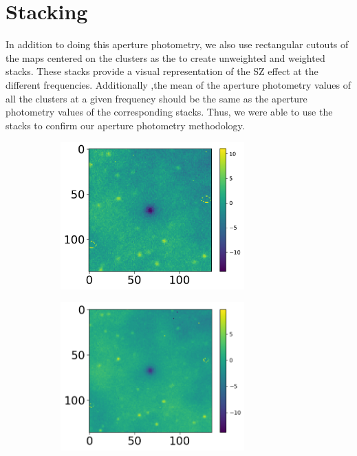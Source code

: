 \documentclass{princeton_astro_thesis}
\begin{document}
\section{Stacking}
In addition to doing this aperture photometry, we also use rectangular cutouts of the maps centered on the clusters as the to create unweighted and weighted stacks. These stacks provide a visual representation of the SZ effect at the different frequencies. Additionally ,the mean of the aperture photometry values of all the clusters at a given frequency should be the same as the aperture photometry values of the corresponding stacks. Thus, we were able to use the stacks to confirm our aperture photometry methodology. 
\begin{figure}[ht]
  \begin{subfigure}[b]{0.5\linewidth}
    \centering\includegraphics[width=200pt]{../f90_redmapper_wstack.pdf}
    \caption{\label{fig:fig1}}
  \end{subfigure}
  \begin{subfigure}[b]{0.1\linewidth}
    \centering\includegraphics[width=200pt]{../f150_redmapper_wstack.png}
    \caption{\label{fig:fig2}}
  \end{subfigure}
  \newline
  \begin{subfigure}[b]{0.5\linewidth}

\end{subfigure}
\end{figure}
\end{document}
